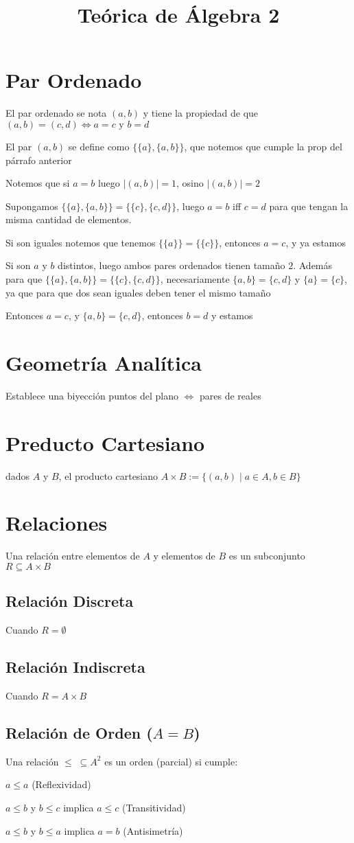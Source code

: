 \documentclass{article}
\title{Teórica de Álgebra 2}
\begin{document}
	\maketitle
	\section{Par Ordenado}
	El par ordenado se nota $(a, b)$ y tiene la propiedad de que
	$(a, b) = (c, d) \iff a=c \text{ y } b = d$

	El par $(a, b)$ se define como $\{\{a\}, \{a, b\}\}$, que notemos que cumple la prop
	del párrafo anterior

	Notemos que si $a = b$ luego $|(a, b)| = 1$, osino $|(a, b)| = 2$

	Supongamos $\{\{a\}, \{a, b\}\} = \{\{c\}, \{c, d\}\}$, luego $a = b$ iff
	$c = d$ para que tengan la misma cantidad de elementos.

	Si son iguales notemos que tenemos $\{\{a\}\} = \{\{c\}\}$, entonces $a = c$, y
	ya estamos

	Si son $a$ y $b$ distintos, luego ambos pares ordenados tienen tamaño $2$.
	Además para que $\{\{a\}, \{a, b\}\} = \{\{c\}, \{c, d\}\}$, necesariamente
	$\{a, b\} = \{c, d\}$ y $\{a\} = \{c\}$, ya que para que dos sean iguales deben
	tener el mismo tamaño

	Entonces $a = c$, y $\{a, b\} = \{c, d\}$, entonces $b = d$ y estamos

	\section{Geometría Analítica}
	Establece una biyección puntos del plano $\iff$ pares de reales

	\section{Preducto Cartesiano}
	dados $A$ y $B$, el producto cartesiano $A \times B := \{(a, b) \mid a \in A,
	b \in B\}$

	\section{Relaciones}
	Una relación entre elementos de $A$ y elementos de $B$ es un subconjunto $R
	\subseteq A \times B$
	\subsection{Relación Discreta}
	Cuando $R = \emptyset$
	\subsection{Relación Indiscreta}
	Cuando $R = A \times B$

	\subsection{Relación de Orden ($A = B$)}
	Una relación $\leq \;\subseteq A^2$ es un orden (parcial) si cumple:

	$a \leq a$ (Reflexividad)

	$a \leq b$ y $b \leq c$ implica $a \leq c$ (Transitividad)

	$a \leq b$ y $b \leq a$ implica $a = b$ (Antisimetría)
\end{document}
